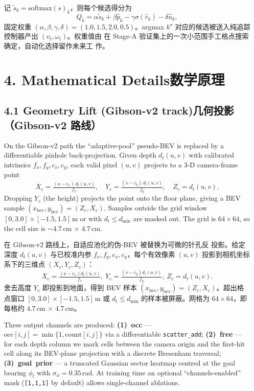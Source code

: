 \documentclass[11pt,a4paper]{article}
\newcommand{\en}[1]{\par\noindent #1\par\vspace{0.15em}}
\newcommand{\zh}[1]{\par\noindent\color{zhcol}\hspace{0.5em}#1\par\color{black}\vspace{0.6em}}
\newcommand{\bisec}[2]{\section[#1]{#1\quad\normalfont\small\color{zhcol}\textsf{#2}}}
\newcommand{\bisubsec}[2]{\subsection[#1]{#1\quad\normalfont\small\color{zhcol}\textsf{#2}}}
\begin{document}
\zh{\textsf{记 $\tilde{s}_k = \mathrm{softmax}(s)_k$，则每个候选得分为
\[
  Q_k = \alpha\tilde{s}_k + \beta\hat{p}_k - \gamma\sigma(\hat r_k) - \delta\hat u_k,
\]
固定权重 $(\alpha,\beta,\gamma,\delta) = (1.0,1.5,2.0,0.5)$。argmax
$k^{\star}$ 对应的候选被送入纯追踪控制器产出 $(v_t,\omega_t)$。权重值由
在 Stage-A 验证集上的一次小范围手工格点搜索确定，自动化选择留作未来工
作。}}

\bisec{4. Mathematical Details}{数学原理}

\bisubsec{4.1 Geometry Lift (Gibson-v2 track)}{几何投影（Gibson-v2 路线）}

\en{On the Gibson-v2 path the ``adaptive-pool'' pseudo-BEV is replaced by a
differentiable pinhole back-projection. Given depth $d_t(u,v)$ with
calibrated intrinsics $f_x, f_y, c_x, c_y$, each valid pixel $(u,v)$
projects to a 3-D camera-frame point
\[
   X_c = \tfrac{(u - c_x)\,d_t(u,v)}{f_x},\quad
   Y_c = \tfrac{(v - c_y)\,d_t(u,v)}{f_y},\quad
   Z_c = d_t(u,v).
\]
Dropping $Y_c$ (the height) projects the point onto the floor plane,
giving a BEV sample $(x_{\mathrm{bev}}, y_{\mathrm{bev}}) = (Z_c, X_c)$.
Samples outside the grid window $[0,3.0]\times[-1.5,1.5]\,$m or with
$d_t \le d_{\min}$ are masked out. The grid is
$64\times 64$, so the cell size is $\sim 4.7\,$cm $\times$ $4.7\,$cm.}

\zh{\textsf{在 Gibson-v2 路线上，自适应池化的伪-BEV 被替换为可微的针孔反
投影。给定深度 $d_t(u,v)$ 与已校准内参 $f_x, f_y, c_x, c_y$，每个有效像素
$(u,v)$ 投影到相机坐标系下的三维点 $(X_c, Y_c, Z_c)$：
\[
   X_c = \tfrac{(u-c_x)d_t(u,v)}{f_x},\ Y_c = \tfrac{(v-c_y)d_t(u,v)}{f_y},\
   Z_c = d_t(u,v).
\]
舍去高度 $Y_c$ 即投影到地面，得到 BEV 样本
$(x_{\mathrm{bev}}, y_{\mathrm{bev}}) = (Z_c, X_c)$。超出格点窗口
$[0,3.0]\times[-1.5,1.5]\,$m 或 $d_t \le d_{\min}$ 的样本被屏蔽。网格为
$64\times 64$，即每格约 $4.7\,$cm $\times$ $4.7\,$cm。}}

\en{Three output channels are produced:
\textbf{(1)~occ} — $\mathrm{occ}[i,j] = \min\{1, \mathrm{count}[i,j]\}$
via a differentiable \texttt{scatter\_add};
\textbf{(2)~free} — for each depth column we mark cells between the camera
origin and the first-hit cell along its BEV-plane projection with a
discrete Bresenham traversal;
\textbf{(3)~goal~prior} — a truncated Gaussian sector heatmap centred at the
goal bearing $\phi_t$ with $\sigma_{\phi}=0.35\,$rad.
At training time an optional ``channels-enabled'' mask
(\texttt{[1,1,1]} by default) allows single-channel ablations.}
\end{document}
